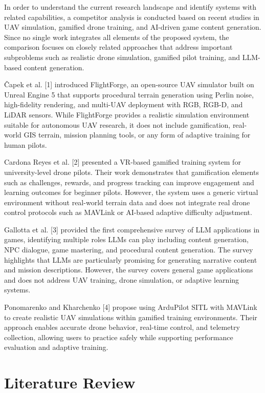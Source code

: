 In order to understand the current research landscape and identify systems with related capabilities, a competitor analysis is conducted based on recent studies in UAV simulation, gamified drone training, and AI-driven game content generation. Since no single work integrates all elements of the proposed system, the comparison focuses on closely related approaches that address important subproblems such as realistic drone simulation, gamified pilot training, and LLM-based content generation.

Čapek et al. [1] introduced FlightForge, an open-source UAV simulator built on Unreal Engine 5 that supports procedural terrain generation using Perlin noise, high-fidelity rendering, and multi-UAV deployment with RGB, RGB-D, and LiDAR sensors. While FlightForge provides a realistic simulation environment suitable for autonomous UAV research, it does not include gamification, real-world GIS terrain, mission planning tools, or any form of adaptive training for human pilots.

Cardona Reyes et al. [2] presented a VR-based gamified training system for university-level drone pilots. Their work demonstrates that gamification elements such as challenges, rewards, and progress tracking can improve engagement and learning outcomes for beginner pilots. However, the system uses a generic virtual environment without real-world terrain data and does not integrate real drone control protocols such as MAVLink or AI-based adaptive difficulty adjustment.

Gallotta et al. [3] provided the first comprehensive survey of LLM applications in games, identifying multiple roles LLMs can play including content generation, NPC dialogue, game mastering, and procedural content generation. The survey highlights that LLMs are particularly promising for generating narrative content and mission descriptions. However, the survey covers general game applications and does not address UAV training, drone simulation, or adaptive learning systems.

Ponomarenko and Kharchenko [4] propose using ArduPilot SITL with MAVLink to create realistic UAV simulations within gamified training environments. Their approach enables accurate drone behavior, real-time control, and telemetry collection, allowing users to practice safely while supporting performance evaluation and adaptive training.

\section{Literature Review}
\label{section:literature-review}

